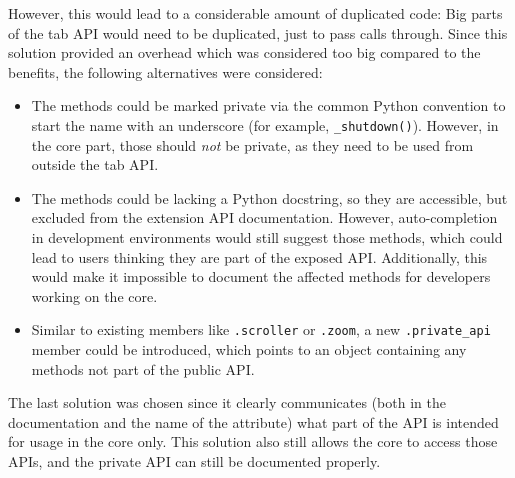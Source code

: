 \documentclass[a4paper,parskip=full,DIV=14,BCOR=15mm]{scrreprt}
\newcommand{\py}[1]{\texttt{#1}}
\begin{document}
However, this would lead to a considerable amount of duplicated code: Big parts
of the tab API would need to be duplicated, just to pass calls through. Since
this solution provided an overhead which was considered too big compared to the
benefits, the following alternatives were considered:

\begin{itemize}
  \item The methods could be marked private via the common Python convention to
    start the name with an underscore (for example, \py{_shutdown()}).
    However, in the core part, those should \emph{not} be private, as they need to
    be used from outside the tab API.
  \item The methods could be lacking a Python docstring, so they are accessible,
    but excluded from the extension API documentation. However, auto-completion
    in development environments would still suggest those methods, which could
    lead to users thinking they are part of the exposed API. Additionally, this
    would make it impossible to document the affected methods for developers
    working on the core.
  \item Similar to existing members like \verb|.scroller| or \verb|.zoom|, a new
    \verb|.private_api| member could be introduced, which points to an object
    containing any methods not part of the public API.
\end{itemize}

The last solution was chosen since it clearly communicates (both in the
documentation and the name of the attribute) what part of the API is intended
for usage in the core only. This solution also still allows the core to access
those APIs, and the private API can still be documented properly.

\newenvironment{umlhighlight}{%
  \let\oldumlfillcolor\umlfillcolor%
  \renewcommand{\umlfillcolor}{yellow}%
}{%
  \renewcommand\umlfillcolor{\oldumlfillcolor}
}
\end{document}
